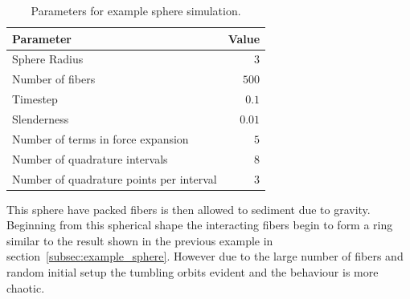 \documentclass[a4paper,11pt]{kth-mag}
\begin{document}
\begin{table}[!htbp]
  \begin{center}
    \begin{tabulary}{0.7\textwidth}{LR}
      \toprule
      Parameter & Value \\
      \midrule
      Sphere Radius & $3$ \\
      Number of fibers & $500$ \\
      Timestep & $0.1$ \\
      Slenderness & $0.01$ \\
      Number of terms in force expansion & $5$ \\
      Number of quadrature intervals & $8$ \\
      Number of quadrature points per interval & $3$ \\
      \bottomrule
    \end{tabulary}
  \end{center}
  \caption{Parameters for example sphere simulation.}
  \label{tab:example_sphere}
\end{table}

This sphere have packed fibers is then allowed to sediment due to gravity. Beginning from this spherical shape the interacting fibers begin to form a ring similar to the result shown in the previous example in section~\ref{subsec:example_sphere}. However due to the large number of fibers and random initial setup the tumbling orbits evident and the behaviour is more chaotic.
\end{document}
